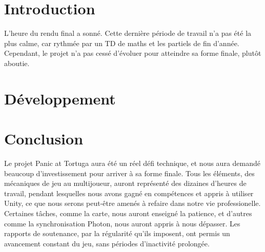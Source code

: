 \documentclass[french]{article}
\begin{document}


\tableofcontents
\newpage

\pagestyle{fancy}

\section{Introduction}

L'heure du rendu final a sonné. Cette dernière période de travail n'a pas été la plus calme, car rythmée par un TD de maths et les partiels de fin d'année.
Cependant, le projet n'a pas cessé d'évoluer pour atteindre sa forme finale, plutôt aboutie.

\newpage
\section{Développement}











\newpage
\section{Conclusion}
Le projet Panic at Tortuga aura été un réel défi technique, et nous aura demandé beaucoup d'investissement pour arriver à sa forme finale. Tous les éléments, 
des mécaniques de jeu au multijoueur, auront représenté des dizaines d'heures de travail, pendant lesquelles nous avons gagné en compétences et appris à utiliser 
Unity, ce que nous serons peut-être amenés à refaire dans notre vie professionelle. Certaines tâches, comme la carte, nous auront enseigné la patience, et d'autres 
comme la synchronisation Photon, nous auront appris à nous dépasser. Les rapports de soutenance, par la régularité qu'ils imposent, ont permis un avancement 
constant du jeu, sans périodes d'inactivité prolongée. 
\listoffigures
\listoftables
\end{document}
